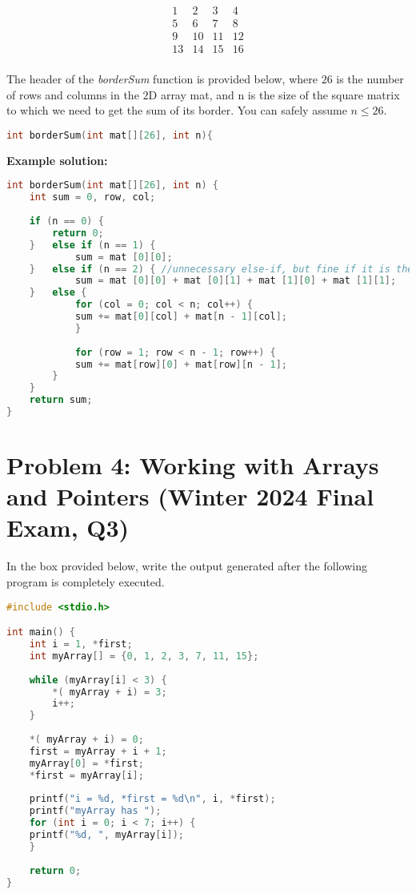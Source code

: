 \documentclass[12pt]{article}
\begin{document}
\[
\begin{array}{cccc}
1 & 2 & 3 &4\\
5 & 6 & 7&8\\
9&10&11&12\\
13&14&15&16\\
\end{array}
\]

The header of the \textit{borderSum} function is provided below, where $26$ is the number of rows and columns in the $2$D array mat, and n is the size of the square matrix to which we need to get the sum of its border. You can safely assume $n \leq 26$.

\begin{lstlisting}[language=C]
int borderSum(int mat[][26], int n){
\end{lstlisting}

\textbf{Example solution:}
\begin{lstlisting}[language=C]
int borderSum(int mat[][26], int n) { 
	int sum = 0, row, col;
	
	if (n == 0) {
		return 0;
	} 	else if (n == 1) {
			sum = mat [0][0];
	} 	else if (n == 2) { //unnecessary else-if, but fine if it is there 
			sum = mat [0][0] + mat [0][1] + mat [1][0] + mat [1][1];
	} 	else {
			for (col = 0; col < n; col++) {
			sum += mat[0][col] + mat[n - 1][col]; 
			}
	
			for (row = 1; row < n - 1; row++) {
			sum += mat[row][0] + mat[row][n - 1];
		} 
	}
	return sum; 
}
\end{lstlisting}

\section*{Problem 4: Working with Arrays and Pointers (Winter 2024 Final Exam, Q3)}
In the box provided below, write the output generated after the following program is completely executed.

\begin{lstlisting}[language=C]
#include <stdio.h> 

int main() {
	int i = 1, *first;
	int myArray[] = {0, 1, 2, 3, 7, 11, 15};
	
	while (myArray[i] < 3) { 
		*( myArray + i) = 3; 
		i++;
	}
	
	*( myArray + i) = 0; 
	first = myArray + i + 1; 
	myArray[0] = *first; 
	*first = myArray[i];
	
	printf("i = %d, *first = %d\n", i, *first); 
	printf("myArray has ");
	for (int i = 0; i < 7; i++) {
	printf("%d, ", myArray[i]); 
	}
	
	return 0; 
}
\end{lstlisting}
\end{document}
